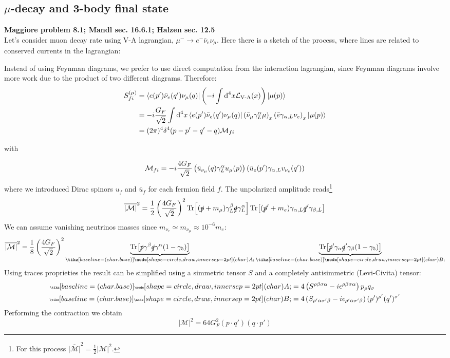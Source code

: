 \documentclass[TheoreticalPhy_ModB.tex]{subfiles}
\begin{document}
\subsection{$\mu$-decay and 3-body final state}
\textbf{Maggiore problem 8.1; Mandl sec. 16.6.1; Halzen sec. 12.5}\\

Let's consider muon decay rate using V-A lagrangian, $\mu^-\to e^-\bar \nu_e\nu_\mu$. Here there is a sketch of the process, where lines are related to conserved currents in the lagrangian:

\begin{figure}[H]
\centering

\end{figure}

Instead of using Feynman diagrams, we prefer to use direct computation from the interaction lagrangian, since Feynman diagrams involve more work due to the product of two different diagrams. Therefore:
\begin{align*}
S_{fi}^{(\mu)}
&=\bra{e(p')\bar\nu_e(q')\nu_\mu(q)}\left(-i\int\textup{d}^4x\mathcal L_{\text{V-A}}(x)\right)\ket{\mu(p)}\\
&=-i\frac{G_F}{\sqrt2}\int\textup{d}^4x\bra{e(p')\bar\nu_e(q')\nu_\mu(q)}\left(\bar \nu_\mu\gamma^\alpha_L\mu\right)_x\left(\bar e \gamma_{\alpha,L}\nu_e\right)_x\ket{\mu(p)}\\
&=(2\pi)^4\delta^4(p-p'-q'-q)\mathcal M_{fi}
\end{align*}

with

\[\mathcal M_{fi}=-i\frac{4G_F}{\sqrt2}\left(\bar u_{\nu_\mu}(q)\gamma^\alpha_Lu_\mu(p)\right)\left(\bar u_e(p')\gamma_{\alpha,L}v_{\nu_e}(q')\right)\]
where we introduced Dirac spinors $u_f$ and $\bar u_f$ for each fermion field $f$. The unpolarized amplitude reads\footnote{For this process $\overline{|\mathcal M|}^2=\frac12|\mathcal M|^2$.}
\[\overline{|\mathcal M|}^2
=\frac12\left(\frac{4G_F}{\sqrt2}\right)^2\Tr[(\slashed p+m_\mu)\gamma^\beta_L\slashed q\gamma^\alpha_L]\Tr[(\slashed p'+m_e)\gamma_{\alpha,L}\slashed q'\gamma_{\beta, L}]\]
We can assume vanishing neutrinos masses since $m_{\nu_e}\simeq m_{\nu_\mu}\approx 10^{-6}m_e$:
\[\overline{|\mathcal M|}^2
=\frac18\p{\frac{4G_F}{\sqrt2}}^2\underbrace{\Tr[\slashed p\gamma^\beta\slashed q\gamma^\alpha(1-\gamma_5)]}_{\tiny\circled A}\underbrace{\Tr[\slashed p'\gamma_{\alpha}\slashed q'\gamma_{\beta}(1-\gamma_5)]}_{\tiny\circled B}\]
Using traces proprieties the result can be simplified using a simmetric tensor $S$ and a completely antisimmetric (Levi-Civita) tensor:
\begin{align*}
{\tiny\circled A}&=4\p{S^{\rho\beta\sigma\alpha}-i\epsilon^{\rho\beta\sigma\alpha}}p_\rho q_\sigma\\
{\tiny\circled B}&=4\p{S_{\rho'\alpha\sigma'\beta}-i\epsilon_{\rho'\alpha\sigma'\beta}}(p')^{\rho'}(q')^{\sigma'}
\end{align*}
Performing the contraction we obtain 
\[{|\mathcal M|}^2
=64G_F^2(p\cdot q')(q\cdot p')\]
\end{document}
